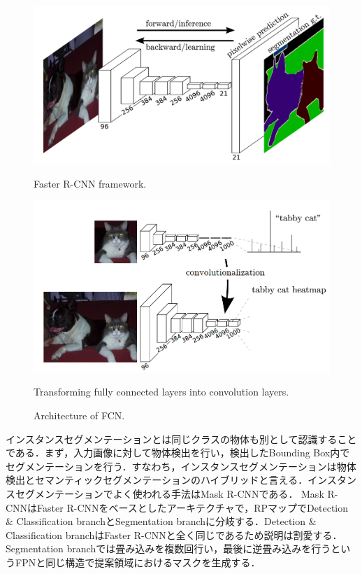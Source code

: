 \begin{figure}
    \centering
    \begin{minipage}[t]{0.45\columnwidth}
        \centering
        \includegraphics[width=\linewidth]{figure/chapter2/FCN}
        \caption[Faster R-CNN framework.]{Faster R-CNN framework\cite{FCN}.}
        \label{fig:FCN}
    \end{minipage}
    \begin{minipage}[t]{0.05\columnwidth}
        \hspace{5pt}
    \end{minipage}
    \begin{minipage}[t]{0.45\columnwidth}
        \centering
        \includegraphics[width=\linewidth]{figure/chapter2/FCN2}
        \caption[Transforming fully connected layers into convolution layers.]{Transforming fully connected layers into convolution layers\cite{FCN}.}
        \label{fig:FCN}
    \end{minipage}
    \caption{Architecture of FCN.}
    \label{fig:FCN}
\end{figure}


インスタンスセグメンテーションとは同じクラスの物体も別として認識することである．まず，入力画像に対して物体検出を行い，検出したBounding Box内でセグメンテーションを行う．すなわち，インスタンスセグメンテーションは物体検出とセマンティックセグメンテーションのハイブリッドと言える．インスタンスセグメンテーションでよく使われる手法はMask R-CNNである\cite{MaskRCNN}．
Mask R-CNNはFaster R-CNNをベースとしたアーキテクチャで，RPマップでDetection \& Classification branchとSegmentation branchに分岐する．Detection \& Classification branchはFaster R-CNNと全く同じであるため説明は割愛する．Segmentation branchでは畳み込みを複数回行い，最後に逆畳み込みを行うというFPNと同じ構造で提案領域におけるマスクを生成する．

